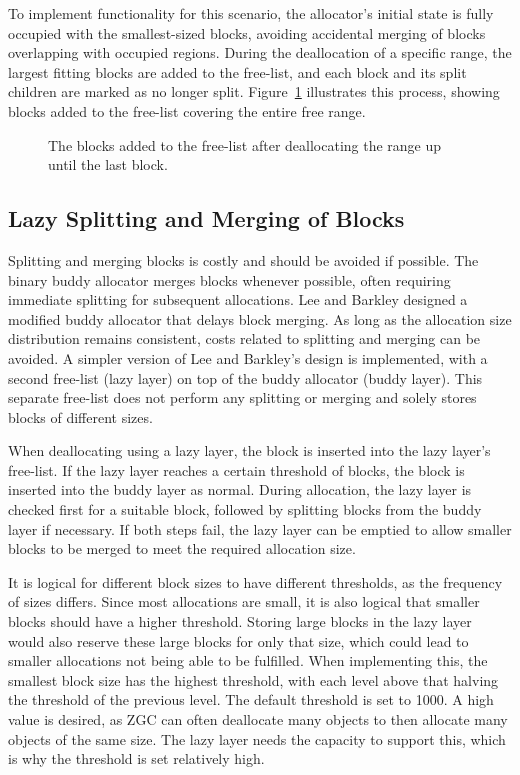 To implement functionality for this scenario, the allocator's initial state is fully occupied with the smallest-sized blocks, avoiding accidental merging of blocks overlapping with occupied regions. During the deallocation of a specific range, the largest fitting blocks are added to the free-list, and each block and its split children are marked as no longer split. Figure~\ref{fig:deallocrange} illustrates this process, showing blocks added to the free-list covering the entire free range.

\begin{figure}[h]
    \centering
    
    \caption{The blocks added to the free-list after deallocating the range up until the last block.}
    \label{fig:deallocrange}
\end{figure}

\subsection{Lazy Splitting and Merging of Blocks} \label{sec:lazyexpl}
Splitting and merging blocks is costly and should be avoided if possible. The binary buddy allocator merges blocks whenever possible, often requiring immediate splitting for subsequent allocations. Lee and Barkley \cite{lazylayer} designed a modified buddy allocator that delays block merging. As long as the allocation size distribution remains consistent, costs related to splitting and merging can be avoided. A simpler version of Lee and Barkley's design is implemented, with a second free-list (lazy layer) on top of the buddy allocator (buddy layer). This separate free-list does not perform any splitting or merging and solely stores blocks of different sizes.

When deallocating using a lazy layer, the block is inserted into the lazy layer's free-list. If the lazy layer reaches a certain threshold of blocks, the block is inserted into the buddy layer as normal. During allocation, the lazy layer is checked first for a suitable block, followed by splitting blocks from the buddy layer if necessary. If both steps fail, the lazy layer can be emptied to allow smaller blocks to be merged to meet the required allocation size.

It is logical for different block sizes to have different thresholds, as the frequency of sizes differs. Since most allocations are small, it is also logical that smaller blocks should have a higher threshold. Storing large blocks in the lazy layer would also reserve these large blocks for only that size, which could lead to smaller allocations not being able to be fulfilled. When implementing this, the smallest block size has the highest threshold, with each level above that halving the threshold of the previous level. The default threshold is set to 1000. A high value is desired, as ZGC can often deallocate many objects to then allocate many objects of the same size. The lazy layer needs the capacity to support this, which is why the threshold is set relatively high.

